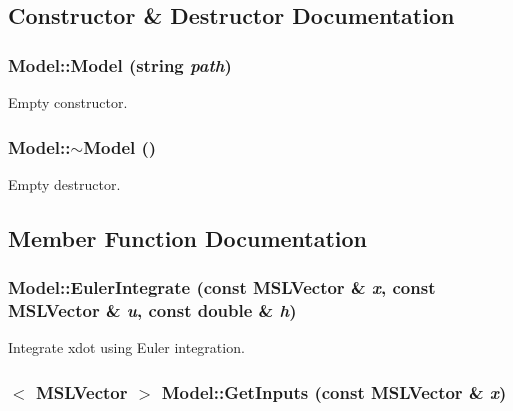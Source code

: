 \subsection{Constructor \& Destructor Documentation}
\subsubsection{\setlength{\rightskip}{0pt plus 5cm}Model::Model (string {\em path})}\label{classModel_a0}


Empty constructor.

\subsubsection{\setlength{\rightskip}{0pt plus 5cm}Model::$\sim$Model ()\hspace{0.3cm}{\tt  [inline, virtual]}}\label{classModel_a1}


Empty destructor.



\subsection{Member Function Documentation}
\subsubsection{ Model::Euler\-Integrate (const {\bf MSLVector} \& {\em x}, const {\bf MSLVector} \& {\em u}, const double \& {\em h})\hspace{0.3cm}{\tt  [protected]}}\label{classModel_b1}


Integrate xdot using Euler integration.

\subsubsection{$<$ {\bf MSLVector} $>$ Model::Get\-Inputs (const {\bf MSLVector} \& {\em x})\hspace{0.3cm}{\tt  [virtual]}}\label{classModel_a2}


